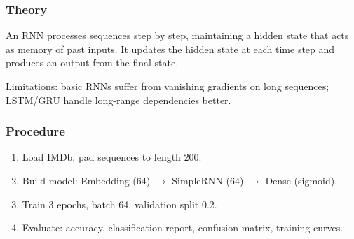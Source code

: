 \documentclass[a4paper,10pt]{article}
\begin{document}
\subsubsection{Theory}
An RNN processes sequences step by step, maintaining a hidden state that acts as memory of past inputs. It updates the hidden state at each time step and produces an output from the final state.

Limitations: basic RNNs suffer from vanishing gradients on long sequences; LSTM/GRU handle long-range dependencies better.

\subsubsection{Procedure}
\begin{enumerate}[nosep]
    \item Load IMDb, pad sequences to length 200.
    \item Build model: Embedding (64) \(\rightarrow\) SimpleRNN (64) \(\rightarrow\) Dense (sigmoid).
    \item Train 3 epochs, batch 64, validation split 0.2.
    \item Evaluate: accuracy, classification report, confusion matrix, training curves.
\end{enumerate}
\end{document}
